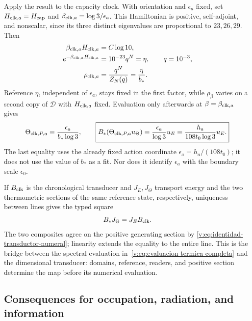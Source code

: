 Apply the result to the capacity clock. With orientation and $\epsilon_a$
fixed, set $H_{{\rm clk},a}=H_{\rm cap}$ and
$\beta_{{\rm clk},a}=\log3/\epsilon_a$. This Hamiltonian is positive,
self-adjoint, and nonscalar, since its three distinct eigenvalues are
proportional to $23,26,29$. Then
\begin{align}
 \beta_{{\rm clk},a}H_{{\rm clk},a}
   &=C\log10,\nonumber\\
 e^{-\beta_{{\rm clk},a}H_{{\rm clk},a}}
   &=10^{-23}q^N=\eta,\qquad q=10^{-3},\nonumber\\
 \rho_{{\rm clk},a}
   &=\frac{q^N}{Z_N(q)}=\frac{\eta}{b_*}.
 \label{v:eq:estado-reloj-capacidad}
\end{align}
Reference $\eta$, independent of $\epsilon_a$, stays fixed in the first
factor, while $\rho_\beta$ varies on a second copy of $\mathcal D$ with
$H_{{\rm clk},a}$ fixed. Evaluation only afterwards at
$\beta=\beta_{{\rm clk},a}$ gives
\begin{equation}
 \Theta_{{\rm clk},P,a}=\frac{\epsilon_a}{b_*\log3},
 \qquad
 \boxed{B_*(\Theta_{{\rm clk},P,a}u_\Theta)
 =\frac{\epsilon_a}{\log3}u_E
 =\frac{h_a}{108t_0\log3}u_E.}
 \label{v:eq:identidad-transductor-numeral}
\end{equation}
The last equality uses the already fixed action coordinate
$\epsilon_a=h_a/(108t_0)$; it does not use the value of $b_*$ as a fit.
Nor does it identify $\epsilon_a$ with the boundary scale $\epsilon_0$.

If $B_{\rm clk}$ is the chronological transducer and $J_E,J_\Theta$
transport energy and the two thermometric sections of the same reference
state, respectively, uniqueness between lines gives the typed square
\begin{equation}
 B_*J_\Theta=J_EB_{\rm clk}.
 \label{v:eq:cuadrado-transductor-marcado}
\end{equation}
The two composites agree on the positive generating section by
\eqref{v:eq:identidad-transductor-numeral}; linearity extends the equality
to the entire line. This is the bridge between the spectral evaluation
in~\eqref{v:eq:evaluacion-termica-completa} and the dimensional transducer:
domains, reference, readers, and positive section determine the map before
its numerical evaluation.

\clearpage
\subsection{Consequences for occupation, radiation, and information}

